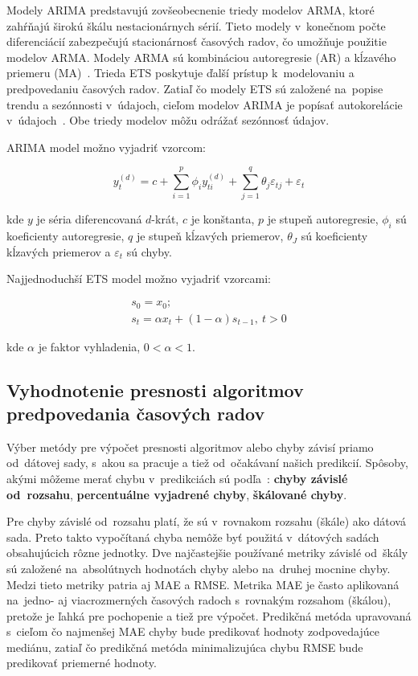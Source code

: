 \documentclass[thesismargins, thesislinespacing, openright, upjsfrontpage]{rnthesis}
\begin{document}
Modely ARIMA predstavujú zovšeobecnenie triedy modelov ARMA, ktoré zahŕňajú širokú škálu nestacionárnych sérií. Tieto modely v~konečnom počte diferenciácií zabezpečujú stacionárnosť časových radov, čo umožňuje použitie modelov ARMA. Modely ARMA sú kombináciou autoregresie (AR) a kĺzavého priemeru (MA)~\cite{box2015time}. Trieda ETS poskytuje ďalší prístup k~modelovaniu a predpovedaniu časových radov. Zatiaľ čo modely ETS sú založené na~popise trendu a sezónnosti v~údajoch, cieľom modelov ARIMA je popísať autokorelácie v~údajoch~\cite{hyndman2018forecasting}. Obe triedy modelov môžu odrážať sezónnosť údajov.

ARIMA model možno vyjadriť vzorcom:
 
\begin{equation}
y_t^{(d)} = c + \sum_{i = 1} ^ {p} \phi_{i} y_{ti}^{(d)} + \sum_{j = 1}^{q} \theta_j \varepsilon_{tj} + \varepsilon_t
\end{equation}
 
kde $y$ je séria diferencovaná $d$-krát, $c$ je konštanta, $p$ je stupeň autoregresie, $\phi_i$ sú koeficienty autoregresie, $q$ je stupeň kĺzavých priemerov, $\theta_J$ sú koeficienty kĺzavých priemerov a $\varepsilon_t$ sú chyby.

Najjednoduchší ETS model možno vyjadriť vzorcami:

\begin{equation}
  \begin{array}{l}
    s_{0} = x_{0}; \\
    s_{t} = \alpha x_{t}+(1-\alpha )s_{t-1},\ t>0
  \end{array}
\end{equation}

kde $\alpha$ je faktor vyhladenia, $0<\alpha <1$.

\subsection{Vyhodnotenie presnosti algoritmov predpovedania časových radov}

Výber metódy pre výpočet presnosti algoritmov alebo chyby závisí priamo od~dátovej sady, s~akou sa pracuje a tiež od~očakávaní našich predikcií. Spôsoby, akými môžeme merať chybu v~predikciách sú podľa~\cite{hyndman2018forecasting}:  \textbf{chyby závislé od~rozsahu}, \textbf{percentuálne vyjadrené chyby},  \textbf{škálované chyby}. 

Pre chyby závislé od~rozsahu platí, že sú v~rovnakom rozsahu (škále) ako dátová sada. Preto takto vypočítaná chyba nemôže byť použitá v~dátových sadách obsahujúcich rôzne jednotky. Dve najčastejšie používané metriky závislé od~škály sú založené na~absolútnych hodnotách chyby alebo na~druhej mocnine chyby. Medzi tieto metriky patria aj MAE a RMSE. Metrika MAE je často aplikovaná na~jedno- aj viacrozmerných časových radoch s~rovnakým rozsahom (škálou), pretože je ľahká pre pochopenie a tiež pre výpočet. Predikčná metóda upravovaná s~cieľom čo najmenšej MAE chyby bude predikovať hodnoty zodpovedajúce mediánu, zatiaľ čo predikčná metóda minimalizujúca chybu RMSE bude predikovať priemerné hodnoty. 
\end{document}
